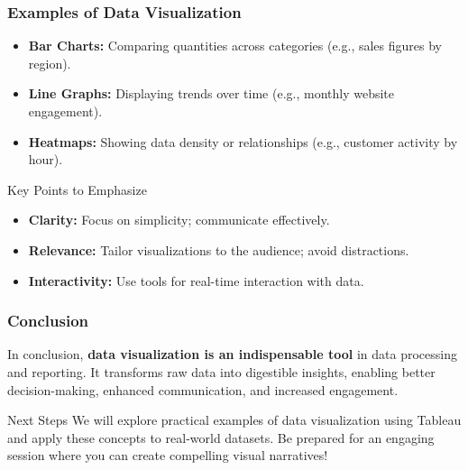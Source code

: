 \documentclass[aspectratio=169]{beamer}
\begin{document}
\begin{frame}[fragile]
    \frametitle{Examples of Data Visualization}
    \begin{itemize}
        \item \textbf{Bar Charts:} 
        Comparing quantities across categories (e.g., sales figures by region).
        
        \item \textbf{Line Graphs:} 
        Displaying trends over time (e.g., monthly website engagement).
        
        \item \textbf{Heatmaps:} 
        Showing data density or relationships (e.g., customer activity by hour).
    \end{itemize}

    \begin{block}{Key Points to Emphasize}
        \begin{itemize}
            \item \textbf{Clarity:} 
            Focus on simplicity; communicate effectively.
            
            \item \textbf{Relevance:} 
            Tailor visualizations to the audience; avoid distractions.
            
            \item \textbf{Interactivity:} 
            Use tools for real-time interaction with data.
        \end{itemize}
    \end{block}
\end{frame}

\begin{frame}[fragile]
    \frametitle{Conclusion}
    In conclusion, \textbf{data visualization is an indispensable tool} in data processing and reporting. It transforms raw data into digestible insights, enabling better decision-making, enhanced communication, and increased engagement.

    \begin{block}{Next Steps}
        We will explore practical examples of data visualization using Tableau and apply these concepts to real-world datasets. Be prepared for an engaging session where you can create compelling visual narratives!
    \end{block}
\end{frame}
\end{document}
